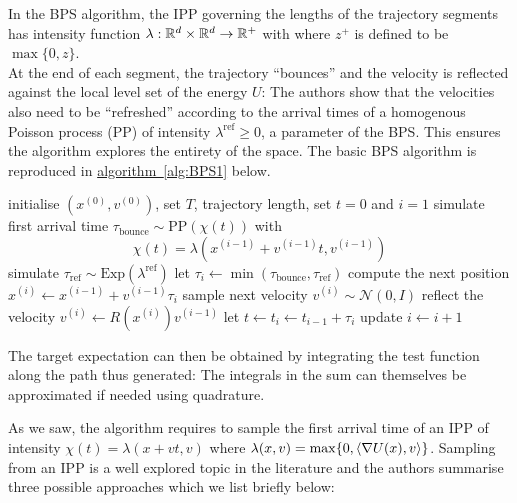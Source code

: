 In the BPS algorithm, the IPP governing the lengths of the trajectory segments has intensity function $\lambda:\mathbb R^{d}\times\mathbb R^{d}\to\mathbb R^{+}$ with
%
%
where $z^{+}$ is defined to be $\max \{0, z\}$.\\
At the end of each segment, the trajectory ``bounces'' and the velocity is reflected against the local level set of the energy $U$:
The authors show that the velocities also need to be ``refreshed'' according to the arrival times of a homogenous Poisson process (PP) of intensity $\lambda^{\text{ref}}\ge 0$, a parameter of the BPS. This ensures the algorithm explores the entirety of the space. The basic BPS algorithm is reproduced in \hyperref[alg:BPS1]{algorithm~\ref*{alg:BPS1}} below.

\begin{algorithm}[!h]\small
	\caption{\label{alg:BPS1}\small {}}
	\begin{algorithmic}[1]
	\State initialise $(x^{(0)},v^{(0)})$, set $T$, trajectory length, set $t=0$ and $i=1$
		\State simulate first arrival time $\tau_{\text{bounce}} \sim \text{PP}(\chi(t))$  with
		$$ \chi(t) = \lambda(x^{(i-1)}+v^{(i-1)}t,v^{(i-1)})$$
		\State simulate $\tau_{\text{ref}}\sim \mathrm{Exp}(\lambda^{\text{ref}})$
		\State let $\tau_{i}\leftarrow \min(\tau_{\text{bounce}},\tau_{\text{ref}})$
		\State compute the next position $x^{(i)}\leftarrow x^{(i-1)}+v^{(i-1)}\tau_{i}$
			\State sample next velocity $v^{(i)}\sim \mathcal N(0,I)$		
			\State reflect the velocity $v^{(i)}\leftarrow R(x^{(i)})v^{(i-1)}$
		\EndIf
		\State let $t\leftarrow t_{i}\leftarrow t_{i-1}+\tau_{i}$
		\State update $i\leftarrow i+1$
	\EndWhile
	\end{algorithmic}
\end{algorithm}

The target expectation can then be obtained by integrating the test function along the path thus generated:
The integrals in the sum can themselves be approximated if needed using quadrature.

As we saw, the algorithm requires to sample the first arrival time of an IPP of intensity $\chi(t)=\lambda(x+vt,v)$ where $\lambda(x,v)=\max\{0,\left\langle \nabla U(x),v \right\rangle\}$. Sampling from an IPP is a well explored topic in the literature and the authors summarise three possible approaches which we list briefly below:

